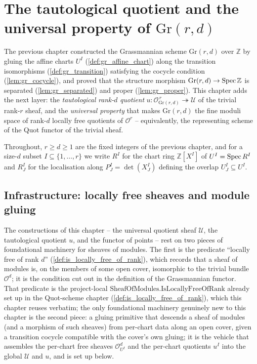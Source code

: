 \chapter{The tautological quotient and the universal property of $\mathrm{Gr}(r,d)$}
\label{chap:Picard_GrassmannianQuot}

\providecommand{\ShMod}{\mathrm{SheafOfModules}}

The previous chapter constructed the Grassmannian scheme \(\mathrm{Gr}(r,d)\) over
\(\mathbb{Z}\) by gluing the affine charts \(U^I\)
(\cref{def:gr_affine_chart}) along the transition isomorphisms
(\cref{def:gr_transition}) satisfying the cocycle condition
(\cref{lem:gr_cocycle}), and proved that the structure morphism
\(\mathrm{Gr}(r,d) \to \operatorname{Spec} \mathbb{Z}\) is separated (\cref{lem:gr_separated})
and proper (\cref{lem:gr_proper}). This chapter adds the next layer: the
\emph{tautological rank-\(d\) quotient}
\(u : \mathcal{O}_{\mathrm{Gr}(r,d)}^{\,r} \twoheadrightarrow \mathcal{U}\) of the
trivial rank-\(r\) sheaf, and the \emph{universal property} that makes
\(\mathrm{Gr}(r,d)\) the fine moduli space of rank-\(d\) locally free quotients of
\(\mathcal{O}^{r}\) -- equivalently, the representing scheme of the Quot functor
of the trivial sheaf.

Throughout, \(r \ge d \ge 1\) are the fixed integers of the previous chapter, and
for a size-\(d\) subset \(I \subseteq \{1,\dots,r\}\) we write \(R^I\) for the
chart ring \(\mathbb{Z}[X^I]\) of \(U^I = \operatorname{Spec} R^I\) and \(R^I_J\) for the
localisation along \(P^I_J = \det(X^I_J)\) defining the overlap
\(U^I_J \subseteq U^I\).

\section{Infrastructure: locally free sheaves and module gluing}
\label{sec:grquot_infra}

The constructions of this chapter -- the universal quotient sheaf
\(\mathcal{U}\), the tautological quotient \(u\), and the functor of points -- rest
on two pieces of foundational machinery for sheaves of modules. The first is the
predicate ``locally free of rank \(d\)'' (\cref{def:is_locally_free_of_rank}),
which records that a sheaf of modules is, on the members of some open cover,
isomorphic to the trivial bundle \(\mathcal{O}^{d}\); it is the condition cut out
in the definition of the Grassmannian functor. That predicate is the project-local
\(\mathrm{SheafOfModules.IsLocallyFreeOfRank}\) already set up in the Quot-scheme
chapter (\cref{def:is_locally_free_of_rank}), which this chapter reuses verbatim;
the only foundational machinery genuinely new to this chapter is the second piece:
a gluing primitive that descends a sheaf of modules (and a morphism of such
sheaves) from per-chart data along an open cover, given a transition cocycle
compatible with the cover's own gluing; it is the vehicle that assembles the
per-chart free sheaves \(\mathcal{O}^{d}_{U^I}\) and the per-chart quotients
\(u^I\) into the global \(\mathcal{U}\) and \(u\), and is set up below.

